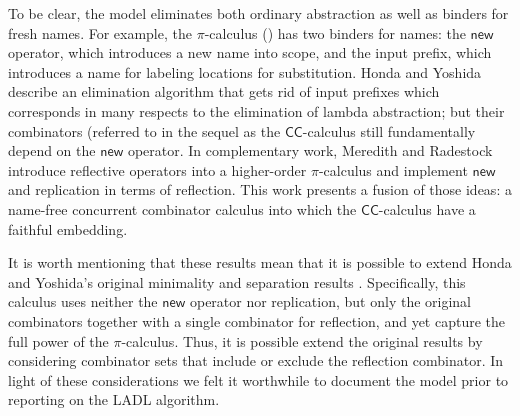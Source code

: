 \documentclass[submission,copyright,creativecommons]{eptcs}
\newcommand{\new}{\mathsf{new}}
\newcommand{\pic}{$\pi$-calculus}
\newcommand{\ccomb}{$\mathsf{CC}$-calculus}
\theoremstyle{definition}
\theoremstyle{remark}
\theoremstyle{remark}
\begin{document}
To be clear, the model eliminates both ordinary abstraction as well as
binders for fresh names. For example, the {\pic}
(\cite{milner91polyadicpi}) has two binders for names: the $\new$
operator, which introduces a new name into scope, and the input
prefix, which introduces a name for labeling locations for
substitution.  Honda and Yoshida
\cite{DBLP:conf/popl/HondaY94,DBLP:journals/tcs/Yoshida02} describe an
elimination algorithm that gets rid of input prefixes which
corresponds in many respects to the elimination of lambda abstraction;
but their combinators (referred to in the sequel as the {\ccomb} still
fundamentally depend on the $\new$ operator.  In complementary work,
Meredith and Radestock \cite{DBLP:journals/entcs/MeredithR05}
introduce reflective operators into a higher-order {\pic} and
implement $\new$ and replication in terms of reflection.  This work
presents a fusion of those ideas: a name-free concurrent combinator
calculus into which the {\ccomb} have a faithful embedding.

It is worth mentioning that these results mean that it is possible to
extend Honda and Yoshida's original minimality and separation results
\cite{DBLP:journals/tcs/Yoshida02}. Specifically, this calculus uses
neither the $\mathsf{new}$ operator nor replication, but only the
original combinators together with a single combinator for reflection,
and yet capture the full power of the {\pic}. Thus, it is possible
extend the original results by considering combinator sets that
include or exclude the reflection combinator. In light of these
considerations we felt it worthwhile to document the model prior to
reporting on the LADL algorithm.
\end{document}
